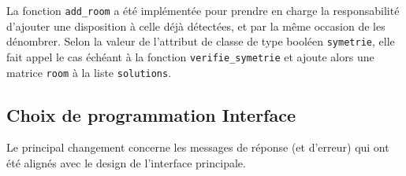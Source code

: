 La fonction \texttt{add\_room} a été implémentée pour prendre en charge la responsabilité d'ajouter une disposition
à celle déjà détectées, et par la même occasion de les dénombrer. Selon la valeur de l'attribut de classe de type booléen
\texttt{symetrie}, elle fait appel le cas échéant à la fonction \texttt{verifie\_symetrie} et ajoute alors une matrice
\texttt{room} à la liste \texttt{solutions}.


\subsection{Choix de programmation Interface}

Le principal changement concerne les messages de réponse (et d’erreur) qui ont été alignés avec le design de l’interface principale.\\

